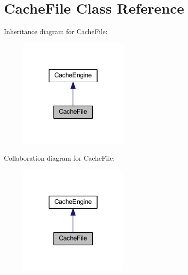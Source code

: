 \hypertarget{class_cache_file}{\section{Cache\-File Class Reference}
\label{class_cache_file}
}


Inheritance diagram for Cache\-File\-:
\nopagebreak
\begin{figure}[H]
\begin{center}
\leavevmode
\includegraphics[width=154pt]{class_cache_file__inherit__graph}
\end{center}
\end{figure}


Collaboration diagram for Cache\-File\-:
\nopagebreak
\begin{figure}[H]
\begin{center}
\leavevmode
\includegraphics[width=154pt]{class_cache_file__coll__graph}
\end{center}
\end{figure}
